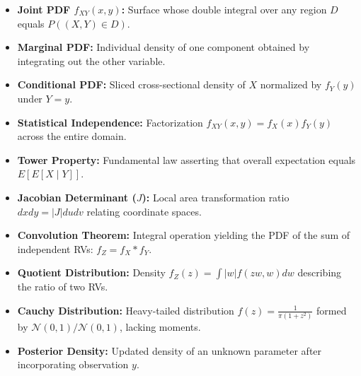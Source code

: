 \documentclass[12pt,a4paper]{article}
\begin{document}
\begin{tcolorbox}[defbox, title={\textbf{One-Line Definitions}}]
\small
\begin{itemize}[leftmargin=12pt, itemsep=2pt, topsep=0pt, parsep=0pt]
  \item \textbf{Joint PDF $f_{XY}(x,y)$:} Surface whose double integral over any region $D$ equals $P((X,Y) \in D)$.
  \item \textbf{Marginal PDF:} Individual density of one component obtained by integrating out the other variable.
  \item \textbf{Conditional PDF:} Sliced cross-sectional density of $X$ normalized by $f_Y(y)$ under $Y=y$.
  \item \textbf{Statistical Independence:} Factorization $f_{XY}(x,y) = f_X(x) f_Y(y)$ across the entire domain.
  \item \textbf{Tower Property:} Fundamental law asserting that overall expectation equals $E[E[X \mid Y]]$.
  \item \textbf{Jacobian Determinant ($J$):} Local area transformation ratio $dx dy = |J| du dv$ relating coordinate spaces.
  \item \textbf{Convolution Theorem:} Integral operation yielding the PDF of the sum of independent RVs: $f_Z = f_X * f_Y$.
  \item \textbf{Quotient Distribution:} Density $f_Z(z) = \int |w| f(zw, w) dw$ describing the ratio of two RVs.
  \item \textbf{Cauchy Distribution:} Heavy-tailed distribution $f(z) = \frac{1}{\pi(1+z^2)}$ formed by $\mathcal{N}(0,1)/\mathcal{N}(0,1)$, lacking moments.
  \item \textbf{Posterior Density:} Updated density of an unknown parameter after incorporating observation $y$.
\end{itemize}
\end{tcolorbox}
\end{document}
